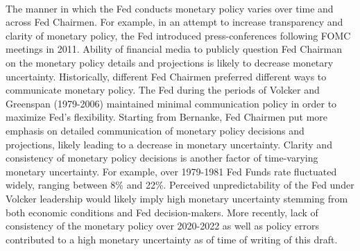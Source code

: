 \documentclass[12pt]{article}
\begin{document}
\paragraph{}
The manner in which the Fed conducts monetary policy varies over time and across Fed Chairmen. For example, in an attempt to increase transparency and clarity of monetary policy, the Fed introduced press-conferences following FOMC meetings in 2011. Ability of financial media to publicly question Fed Chairman on the monetary policy details and projections is likely to decrease monetary uncertainty. Historically, different Fed Chairmen preferred different ways to communicate monetary policy. The Fed during the periods of Volcker and Greenspan (1979-2006) maintained minimal communication policy in order to maximize Fed's flexibility. Starting from Bernanke, Fed Chairmen put more emphasis on detailed communication of monetary policy decisions and projections, likely leading to a decrease in monetary uncertainty. Clarity and consistency of monetary policy decisions is another factor of time-varying monetary uncertainty. For example, over 1979-1981 Fed Funds rate fluctuated widely, ranging between 8\% and 22\%. Perceived unpredictability of the Fed under Volcker leadership would likely imply high monetary uncertainty stemming from both economic conditions and Fed decision-makers. More recently, lack of consistency of the monetary policy over 2020-2022 as well as policy errors contributed to a high monetary uncertainty as of time of writing of this draft.
\end{document}
